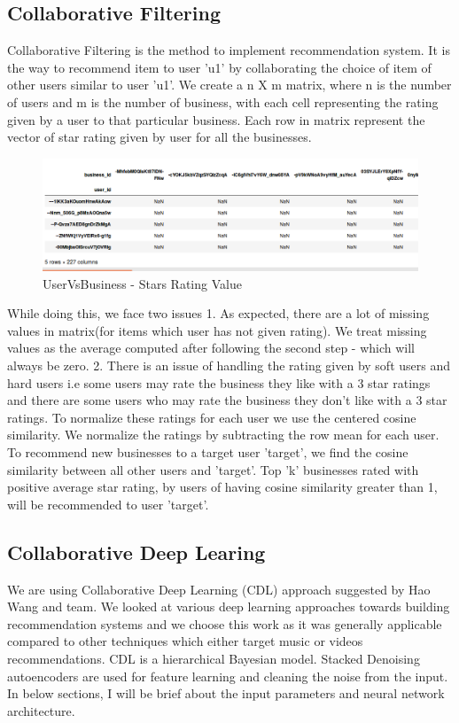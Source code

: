 \documentclass[11pt]{article}
\begin{document}
		\subsection{Collaborative Filtering}
		Collaborative Filtering is the method to implement recommendation system. It is the way to recommend item to user 'u1' by collaborating the choice of item of other users similar to user 'u1'. We create a n X m matrix, where n is the number of users and m is the number of business, with each cell representing the rating given by a user to that particular business. Each row in matrix represent the vector of star rating given by user for all the businesses. \\
	 
	 		\begin{figure}[H]
					\centering
					\includegraphics[scale=0.5]{uservsitem.png}
					\caption{UserVsBusiness - Stars Rating Value}
			\end{figure}
	 
		While doing this, we face two issues 
		1. As expected, there are a lot of missing values in matrix(for items which user has not given rating). We treat missing values as the average computed after following the second step - which will always be zero.
		2. There is an issue of handling the rating given by soft users and hard users i.e some users may rate the business they like with a 3 star ratings and there are some users who may rate the business they don't like with a 3 star ratings. To normalize these ratings for each user we use the centered cosine similarity. We normalize the ratings by subtracting the row mean for each user.\cite{vid1}\\
		
		To recommend new businesses to a target user 'target', we find the cosine similarity between all other users and 'target'. Top 'k' businesses rated with positive average star rating, by users of having cosine similarity greater than 1, will be recommended to user 'target'.\cite{vid2}
	
		\subsection{Collaborative Deep Learing} 
		We are using Collaborative Deep Learning \cite{cdl} (CDL) approach suggested by Hao Wang and team. We looked at various deep learning approaches towards building recommendation systems and we choose this work as it was generally applicable compared to other techniques which either target music or videos recommendations. CDL is a hierarchical Bayesian model. Stacked Denoising autoencoders \cite{sdae} are used for feature learning and cleaning the noise from the input. In below sections, I will be brief about the input parameters and neural network architecture.
		
\end{document}
